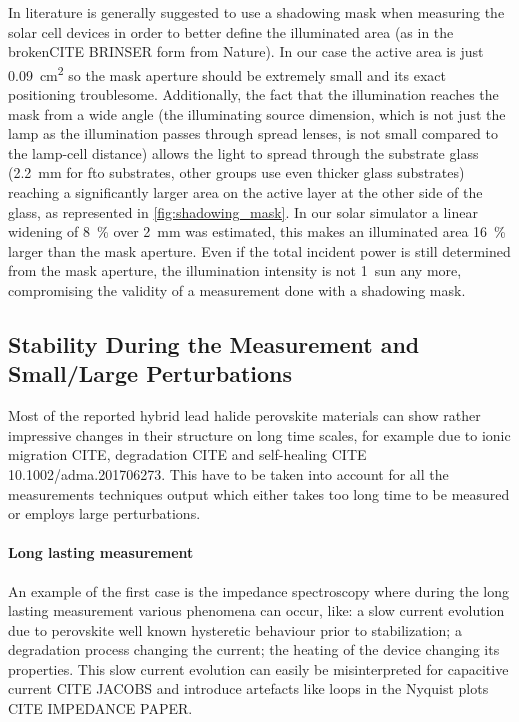 In literature is generally suggested to use a shadowing mask when measuring the solar cell devices in order to better define the illuminated area (as in the brokenCITE BRINSER form from Nature\cite{NatureResearch2017}). %
In our case the active area is just \SI{0.09}{\square\cm} so the mask aperture should be extremely small and its exact positioning troublesome. Additionally, the fact that the illumination reaches the mask from a wide angle (the illuminating source dimension, which is not just the lamp as the illumination passes through spread lenses, is not small compared to the lamp-cell distance) allows the light to spread through the substrate glass (\SI{2.2}{\mm} for \gls{fto} substrates, other groups use even thicker glass substrates) reaching a significantly larger area on the active layer at the other side of the glass, as represented in \cref{fig:shadowing_mask}. In our solar simulator a linear widening of 8~\% over \SI{2}{\mm} was estimated, this makes an illuminated area 16~\% larger than the mask aperture. Even if the total incident power is still determined from the mask aperture, the illumination intensity is not 1~sun any more, compromising the validity of a measurement done with a shadowing mask.


\subsection{Stability During the Measurement and Small/Large Perturbations}

Most of the reported hybrid lead halide perovskite materials can show rather impressive changes in their structure on long time scales, for example due to ionic migration CITE, degradation CITE and self-healing CITE 10.1002/adma.201706273.
This have to be taken into account for all the measurements techniques output which either takes too long time to be measured or employs large perturbations.

\paragraph{Long lasting measurement} An example of the first case is the impedance spectroscopy where during the long lasting measurement various phenomena can occur, like: a slow current evolution due to perovskite well known hysteretic behaviour prior to stabilization; a degradation process changing the current; the heating of the device changing its properties. This slow current evolution can easily be misinterpreted for capacitive current CITE JACOBS and introduce artefacts like loops in the Nyquist plots CITE IMPEDANCE PAPER.

